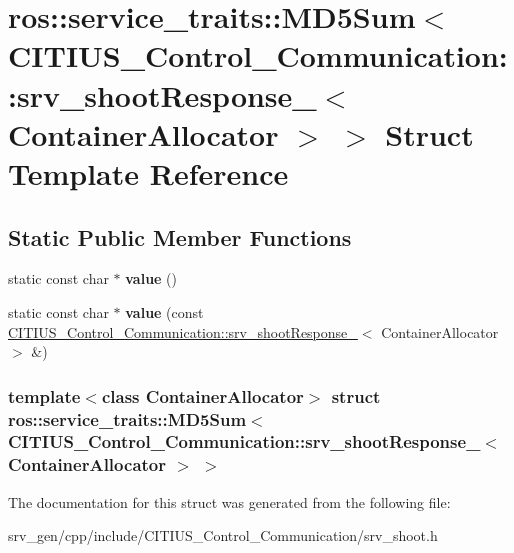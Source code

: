 \hypertarget{structros_1_1service__traits_1_1_m_d5_sum_3_01_c_i_t_i_u_s___control___communication_1_1srv__sho20050a3b47da6258ff1d7b390a19d276}{\section{ros\-:\-:service\-\_\-traits\-:\-:\-M\-D5\-Sum$<$ \-C\-I\-T\-I\-U\-S\-\_\-\-Control\-\_\-\-Communication\-:\-:srv\-\_\-shoot\-Response\-\_\-$<$ \-Container\-Allocator $>$ $>$ \-Struct \-Template \-Reference}
\label{structros_1_1service__traits_1_1_m_d5_sum_3_01_c_i_t_i_u_s___control___communication_1_1srv__sho20050a3b47da6258ff1d7b390a19d276}
}
\subsection*{\-Static \-Public \-Member \-Functions}
\begin{DoxyCompactItemize}
\item 
\hypertarget{structros_1_1service__traits_1_1_m_d5_sum_3_01_c_i_t_i_u_s___control___communication_1_1srv__sho20050a3b47da6258ff1d7b390a19d276_aa0135f5c07f8522244ff81b7e93bea2f}{static const char $\ast$ {\bfseries value} ()}\label{structros_1_1service__traits_1_1_m_d5_sum_3_01_c_i_t_i_u_s___control___communication_1_1srv__sho20050a3b47da6258ff1d7b390a19d276_aa0135f5c07f8522244ff81b7e93bea2f}

\item 
\hypertarget{structros_1_1service__traits_1_1_m_d5_sum_3_01_c_i_t_i_u_s___control___communication_1_1srv__sho20050a3b47da6258ff1d7b390a19d276_ad5c0a8984885740058c11ca8cb3d06e8}{static const char $\ast$ {\bfseries value} (const \hyperlink{struct_c_i_t_i_u_s___control___communication_1_1srv__shoot_response__}{\-C\-I\-T\-I\-U\-S\-\_\-\-Control\-\_\-\-Communication\-::srv\-\_\-shoot\-Response\-\_\-}$<$ \-Container\-Allocator $>$ \&)}\label{structros_1_1service__traits_1_1_m_d5_sum_3_01_c_i_t_i_u_s___control___communication_1_1srv__sho20050a3b47da6258ff1d7b390a19d276_ad5c0a8984885740058c11ca8cb3d06e8}

\end{DoxyCompactItemize}
\subsubsection*{template$<$class Container\-Allocator$>$ struct ros\-::service\-\_\-traits\-::\-M\-D5\-Sum$<$ C\-I\-T\-I\-U\-S\-\_\-\-Control\-\_\-\-Communication\-::srv\-\_\-shoot\-Response\-\_\-$<$ Container\-Allocator $>$ $>$}



\-The documentation for this struct was generated from the following file\-:\begin{DoxyCompactItemize}
\item 
srv\-\_\-gen/cpp/include/\-C\-I\-T\-I\-U\-S\-\_\-\-Control\-\_\-\-Communication/srv\-\_\-shoot.\-h\end{DoxyCompactItemize}
